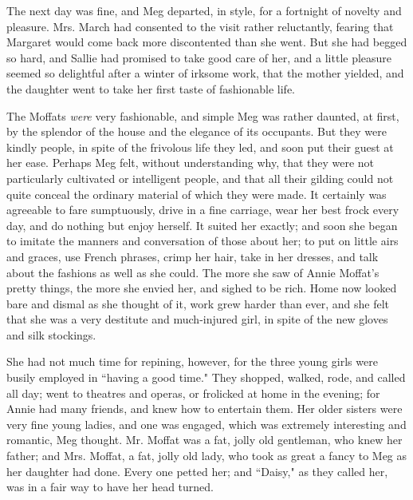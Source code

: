 The next day was fine, and Meg departed, in style, for a fortnight of
novelty and pleasure. Mrs. March had consented to the visit rather
reluctantly, fearing that Margaret would come back more discontented
than she went. But she had begged so hard, and Sallie had promised to
take good care of her, and a little pleasure seemed so delightful after
a winter of irksome work, that the mother yielded, and the daughter went
to take her first taste of fashionable life.

The Moffats \emph{were} very fashionable, and simple Meg was rather
daunted, at first, by the splendor of the house and the elegance of its
occupants. But they were kindly people, in spite of the frivolous life
they led, and soon put their guest at her ease. Perhaps Meg felt,
without understanding why, that they were not particularly cultivated or
intelligent people, and that all their gilding could not quite conceal
the ordinary material of which they were made. It certainly was
agreeable to fare sumptuously, drive in a fine carriage, wear her best
frock every day, and do nothing but enjoy herself. It suited her
exactly; and soon she began to imitate the manners and conversation of
those about her; to put on little airs and graces, use French phrases,
crimp her hair, take in her dresses, and talk about the fashions as well
as she could. The more she saw of Annie Moffat's pretty
things, the more she envied her, and sighed to be rich. Home now looked
bare and dismal as she thought of it, work grew harder than ever, and
she felt that she was a very destitute and much-injured girl, in spite
of the new gloves and silk stockings.

She had not much time for repining, however, for the three young girls
were busily employed in ``having a good time." They shopped, walked,
rode, and called all day; went to theatres and operas, or frolicked at
home in the evening; for Annie had many friends, and knew how to
entertain them. Her older sisters were very fine young ladies, and one
was engaged, which was extremely interesting and romantic, Meg thought.
Mr. Moffat was a fat, jolly old gentleman, who knew her father; and Mrs.
Moffat, a fat, jolly old lady, who took as great a fancy to Meg as her
daughter had done. Every one petted her; and ``Daisy," as they called
her, was in a fair way to have her head turned.


